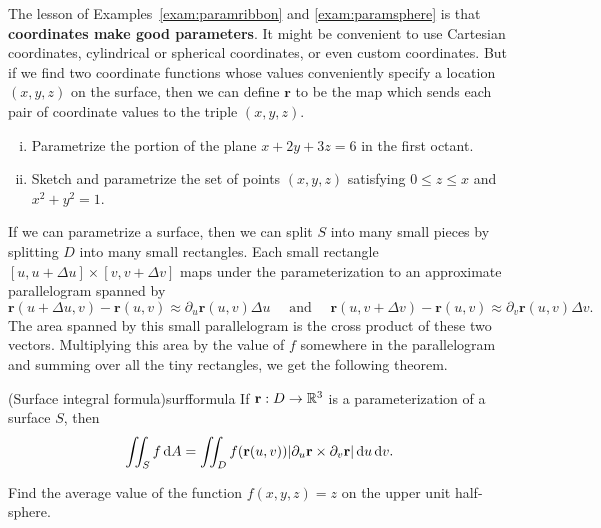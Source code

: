 \documentclass{watsonbook}
\begin{document}
The lesson of Examples~\ref{exam:paramribbon} and
\ref{exam:paramsphere} is that \textbf{coordinates make good
  parameters}. It might be convenient to use Cartesian coordinates,
cylindrical or spherical coordinates, or even custom coordinates. But
if we find two coordinate functions whose values conveniently specify
a location $(x,y,z)$ on the surface, then we can define $\mathbf{r}$
to be the map which sends each pair of coordinate values to the triple
$(x,y,z)$.

\begin{exercise}{}{}
  \begin{enumerate}[(i),itemsep=0pt,leftmargin=12pt]
  \item  Parametrize the portion of the plane $x + 2y + 3z = 6$ in the first
    octant. 
  \item  Sketch and parametrize the set of points $(x,y,z)$ satisfying $0 \leq z
    \leq x$ and $x^2 +
    y^2 = 1$.
  \end{enumerate}
\end{exercise}

If we can parametrize a surface, then we can split $S$ into many small
pieces by splitting $D$ into many small rectangles. Each small
rectangle $[u,u+\Delta u] \times [v,v+\Delta v]$ maps under the
parameterization to an approximate parallelogram spanned by
\[
  \mathbf{r}(u+\Delta u, v) - \mathbf{r}(u,v) \approx \partial_u
  \mathbf{r}(u,v) \Delta u  \quad \text{ and } \quad 
  \mathbf{r}(u, v+\Delta v) - \mathbf{r}(u,v) \approx
  \partial_v
  \mathbf{r}(u,v) \Delta v. 
\]
The area spanned by this small parallelogram is the cross product of
these two vectors. Multiplying this area by the value of $f$ somewhere
in the parallelogram and summing over all the tiny rectangles, we get
the following theorem.
\begin{theo}{(Surface integral formula)}{surfformula}
  If $\mathbf{r}:D \to \mathbb{R}^3$ is a parameterization of a surface $S$, then
  \begin{equation} \label{eq:surfformula} 
    \iint_S f \, {\mathrm{d}}A = \iint_D f(\mathbf{r}(u,v)) |\partial_u
    \mathbf{r} \times \partial_v \mathbf{r}| \, {\mathrm{d}}u\,{\mathrm{d}}v. 
  \end{equation}
\end{theo}

\begin{example}{}{}
  Find the average value of the function $f(x,y,z) = z$ on the upper
  unit half-sphere. 
\end{example}
\end{document}
